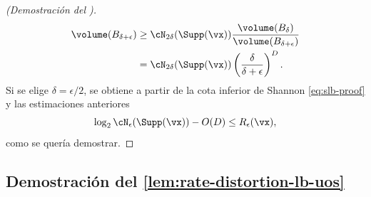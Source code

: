\documentclass[../../book-main_es.tex]{subfiles}
\begin{document}
\begin{proof}[(Demostración del )]
\begin{align}
{        }
        {
            \volume(B_{\delta + \epsilon})
        }
        &\geq
        \cN_{2\delta}(\Supp(\vx))
        \frac{
            \volume(B_{\delta})
        }
        {
            \volume(B_{\delta + \epsilon})
        }
        \\
        &=
        \cN_{2\delta}(\Supp(\vx))
        \left(
            \frac{
                \delta
            }
            {
                \delta + \epsilon
            }
        \right)^D.
    \end{align}
    Si se elige $\delta = \epsilon / 2$, se obtiene a partir de la cota inferior de Shannon
    \eqref{eq:slb-proof} y las estimaciones anteriores
    \begin{equation}
        \log_2 \cN_{\epsilon}(\Supp(\vx))
        - O(D)
        \leq
        R_{\epsilon}(\vx),
    \end{equation}
    como se quería demostrar.

\end{proof}

\subsection{Demostración del 
\ref{lem:rate-distortion-lb-uos}}\label{sec:app-rate-dist-deferred-proofs}
\end{document}
